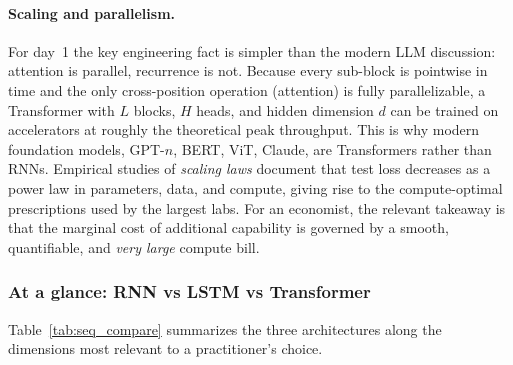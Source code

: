 \documentclass[11pt,a4paper]{report}
\begin{document}
\paragraph{Scaling and parallelism.}  For day~1 the key engineering fact is simpler than the modern LLM discussion: attention is parallel, recurrence is not.  Because every sub-block is pointwise in time and the only cross-position operation (attention) is fully parallelizable, a Transformer with $L$ blocks, $H$ heads, and hidden dimension $d$ can be trained on accelerators at roughly the theoretical peak throughput.  This is why modern foundation models, GPT-$n$, BERT, ViT, Claude, are Transformers rather than RNNs.  Empirical studies of \emph{scaling laws} \citep{kaplan2020scaling, hoffmann2022training} document that test loss decreases as a power law in parameters, data, and compute, giving rise to the compute-optimal prescriptions used by the largest labs.  For an economist, the relevant takeaway is that the marginal cost of additional capability is governed by a smooth, quantifiable, and \emph{very large} compute bill.

\subsubsection{At a glance: RNN vs LSTM vs Transformer}

Table~\ref{tab:seq_compare} summarizes the three architectures along the dimensions most relevant to a practitioner's choice.
\end{document}
